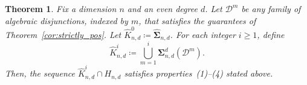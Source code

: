 \documentclass[12pt]{article}
\newcommand{\HSOS}{\widehat{\mathbf{\Sigma}}}
\newcommand{\DiSOS}{\mathbf{\Sigma}}
\newcommand{\defeq}{\coloneq}
\newcommand{\mcD}{\mathcal{D}}
\newtheorem{theorem}{Theorem}%
\theoremstyle{remark}
\begin{document}



\begin{theorem}\label{thm:hier_pop}
Fix a dimension $n$ and an even degree $d$. Let $\mcD^m$ be any family of algebraic disjunctions, indexed by $m$, that satisfies the guarantees of Theorem~\ref{cor:strictly_pos}. 
Let $\widehat{K}_{n,d}^0\defeq\HSOS_{n,d}$. For each integer $i\ge 1$, define
    \begin{equation}\label{eq:hier_pop}
      \widehat{K}_{n,d}^i\defeq  \bigcup_{m=1}^i\DiSOS_{n,d}^d\left(\mcD^m\right) .
    \end{equation}
Then, the sequence $\widehat{K}_{n,d}^i\cap H_{n,d}$ satisfies properties~(1)--(4) stated above.
\end{theorem}
\end{document}
